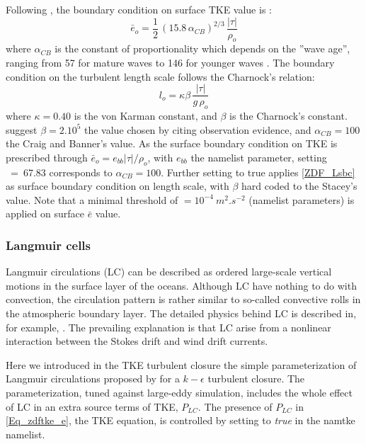\documentclass[NEMO_book]{subfiles}
\begin{document}
Following \citet{Craig_Banner_JPO94}, the boundary condition on surface TKE value is :
\begin{equation}  \label{ZDF_Esbc}
\bar{e}_o = \frac{1}{2}\,\left(  15.8\,\alpha_{CB} \right)^{2/3} \,\frac{|\tau|}{\rho_o}
\end{equation}
where $\alpha_{CB}$ is the \citet{Craig_Banner_JPO94} constant of proportionality 
which depends on the ''wave age'', ranging from 57 for mature waves to 146 for 
younger waves \citep{Mellor_Blumberg_JPO04}. 
The boundary condition on the turbulent length scale follows the Charnock's relation:
\begin{equation} \label{ZDF_Lsbc}
l_o = \kappa \beta \,\frac{|\tau|}{g\,\rho_o}
\end{equation}
where $\kappa=0.40$ is the von Karman constant, and $\beta$ is the Charnock's constant.
\citet{Mellor_Blumberg_JPO04} suggest $\beta = 2.10^{5}$ the value chosen by \citet{Stacey_JPO99}
citing observation evidence, and $\alpha_{CB} = 100$ the Craig and Banner's value.
As the surface boundary condition on TKE is prescribed through $\bar{e}_o = e_{bb} |\tau| / \rho_o$, 
with $e_{bb}$ the  namelist parameter, setting ~=~67.83 corresponds 
to $\alpha_{CB} = 100$. Further setting   to true applies \eqref{ZDF_Lsbc} 
as surface boundary condition on length scale, with $\beta$ hard coded to the Stacey's value.
Note that a minimal threshold of $=10^{-4}~m^2.s^{-2}$ (namelist parameters) 
is applied on surface $\bar{e}$ value.


\subsubsection{Langmuir cells}
Langmuir circulations (LC) can be described as ordered large-scale vertical motions 
in the surface layer of the oceans. Although LC have nothing to do with convection, 
the circulation pattern is rather similar to so-called convective rolls in the atmospheric 
boundary layer. The detailed physics behind LC is described in, for example, 
\citet{Craik_Leibovich_JFM76}. The prevailing explanation is that LC arise from 
a nonlinear interaction between the Stokes drift and wind drift currents. 

Here we introduced in the TKE turbulent closure the simple parameterization of 
Langmuir circulations proposed by \citep{Axell_JGR02} for a $k-\epsilon$ turbulent closure. 
The parameterization, tuned against large-eddy simulation, includes the whole effect
of LC in an extra source terms of TKE, $P_{LC}$.
The presence of $P_{LC}$ in \eqref{Eq_zdftke_e}, the TKE equation, is controlled 
by setting  to \textit{true} in the namtke namelist.
 
\end{document}
